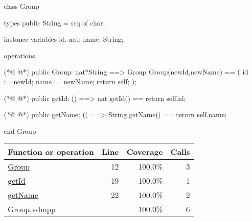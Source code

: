 \begin{vdmpp}[breaklines=true]
class Group

types
public String = seq of char;

instance variables
id: nat;
name: String;

operations

(*@
\label{Group:12}
@*)
public Group: nat*String ==> Group
 Group(newId,newName) == (
  id := newId;
  name := newName;
  return self;
 );
 
(*@
\label{getId:19}
@*)
public getId: () ==> nat
 getId() == return self.id;
 
(*@
\label{getName:22}
@*)
public getName: () ==> String
 getName() == return self.name;

end Group
\end{vdmpp}
\bigskip
\begin{longtable}{|l|r|r|r|}
\hline
Function or operation & Line & Coverage & Calls \\
\hline
\hline
\hyperref[Group:12]{Group} & 12&100.0\% & 3 \\
\hline
\hyperref[getId:19]{getId} & 19&100.0\% & 1 \\
\hline
\hyperref[getName:22]{getName} & 22&100.0\% & 2 \\
\hline
\hline
Group.vdmpp & & 100.0\% & 6 \\
\hline
\end{longtable}

